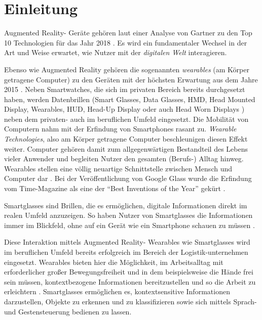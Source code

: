
\chapter{Einleitung}
Augmented Reality- Geräte gehören laut einer Analyse von Gartner zu den Top 10 Technologien für das Jahr 2018 \cite{Panetta2017a}. Es wird ein fundamentaler Wechsel in der Art und Weise erwartet, wie Nutzer mit der \emph{digitalen Welt} interagieren. 

Ebenso wie Augmented Reality gehören die sogenannten \emph{wearables} (am Körper getragene Computer) zu den Geräten mit der höchsten Erwartung aus dem Jahre 2015 \cite{Levy2015}. Neben Smartwatches, die sich im privaten Bereich bereits durchgesetzt haben, werden Datenbrillen (Smart Glasses, Data Glasses, HMD, Head Mounted Display, Wearables, HUD, Head-Up Display oder auch Head Worn Displays \cite{Zobel2016}) neben dem privaten- auch im beruflichen Umfeld eingesetzt. 
Die Mobilität von Computern nahm mit der Erfindung von Smartphones rasant zu. \emph{Wearable Technologies}, also am Körper getragene Computer beschleunigen diesen Effekt weiter. Computer gehören damit zum allgegenwärtigen Bestandteil des Lebens vieler Anwender und begleiten Nutzer den gesamten (Berufs-) Alltag hinweg. Wearables stellen eine völlig neuartige Schnittstelle zwischen Mensch und Computer dar \cite[S.~25f]{Schwenke2016}. Bei der Veröffentlichung von Google Glass wurde die Erfindung vom Time-Magazine als eine der \enquote{Best Inventions of the Year} gekürt \cite{Bilton2015}.

Smartglasses sind Brillen, die es ermöglichen, digitale Informationen direkt im realen Umfeld anzuzeigen. So haben Nutzer von Smartglasses die Informationen immer im Blickfeld, ohne auf ein Gerät wie ein Smartphone schauen zu müssen \cite{Due2014Glasses}.

Diese Interaktion mittels Augmented Reality- Wearables wie Smartglasses wird im beruflichen Umfeld bereits erfolgreich im Bereich der Logistik-unternehmen eingesetzt. Wearables bieten hier die Möglichkeit, im Arbeitsalltag mit erforderlicher großer Bewegungsfreiheit und in dem beispielsweise die Hände frei sein müssen, kontextbezogene Informationen bereitzustellen und so die Arbeit zu erleichtern \cite{Zobel2016}. Smartglasses ermöglichen es, kontextsensitive Informationen darzustellen, Objekte zu erkennen und zu klassifizieren sowie sich mittels Sprach- und Gestensteuerung bedienen zu lassen.
%
%
